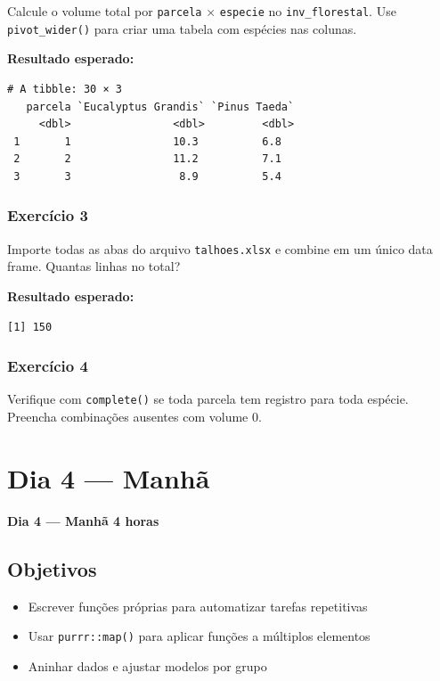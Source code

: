 \documentclass[
  letterpaper,
]{scrbook}
\providecommand{\tightlist}{%
  \setlength{\itemsep}{0pt}\setlength{\parskip}{0pt}}
\begin{document}
Calcule o volume total por \texttt{parcela} × \texttt{especie} no
\texttt{inv\_florestal}. Use \texttt{pivot\_wider()} para criar uma
tabela com espécies nas colunas.

\textbf{Resultado esperado:}

\begin{verbatim}
# A tibble: 30 × 3
   parcela `Eucalyptus Grandis` `Pinus Taeda`
     <dbl>                <dbl>         <dbl>
 1       1                10.3          6.8
 2       2                11.2          7.1
 3       3                 8.9          5.4
\end{verbatim}

\subsection{Exercício 3}\label{exercuxedcio-3-11}

Importe todas as abas do arquivo \texttt{talhoes.xlsx} e combine em um
único data frame. Quantas linhas no total?

\textbf{Resultado esperado:}

\begin{verbatim}
[1] 150
\end{verbatim}

\subsection{Exercício 4}\label{exercuxedcio-4-8}

Verifique com \texttt{complete()} se toda parcela tem registro para toda
espécie. Preencha combinações ausentes com volume 0.

\chapter{Dia 4 --- Manhã}\label{dia-4-manhuxe3}

\textbf{Dia 4 --- Manhã \textbar{} 4 horas}

\section*{Objetivos}\label{objetivos-6}


\begin{itemize}
\tightlist
\item
  Escrever funções próprias para automatizar tarefas repetitivas
\item
  Usar \texttt{purrr::map()} para aplicar funções a múltiplos elementos
\item
  Aninhar dados e ajustar modelos por grupo
\end{itemize}
\end{document}
